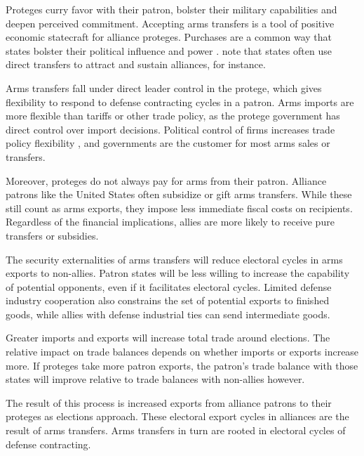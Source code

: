 \documentclass[12pt]{article}
\begin{document}
Proteges curry favor with their patron, bolster their military capabilities and deepen perceived commitment.
Accepting arms transfers is a tool of positive economic statecraft for alliance proteges. 
Purchases are a common way that states bolster their political influence and power \citep[pg. 42-3]{Baldwin2020}.
\citet[pg. 184-5]{IkenberryGrieco2003} note that states often use direct transfers to attract and sustain alliances, for instance.  


Arms transfers fall under direct leader control in the protege, which gives flexibility to respond to defense contracting cycles in a patron.
Arms imports are more flexible than tariffs or other trade policy, as the protege government has direct control over import decisions.
Political control of firms increases trade policy flexibility \citep{Davisetal2019}, and governments are the customer for most arms sales or transfers. 


Moreover, proteges do not always pay for arms from their patron.
Alliance patrons like the United States often subsidize or gift arms transfers. 
While these still count as arms exports, they impose less immediate fiscal costs on recipients.
Regardless of the financial implications, allies are more likely to receive pure transfers or subsidies.


The security externalities of arms transfers will reduce electoral cycles in arms exports to non-allies. 
Patron states will be less willing to increase the capability of potential opponents, even if it facilitates electoral cycles.
Limited defense industry cooperation also constrains the set of potential exports to finished goods, while allies with defense industrial ties can send intermediate goods.


Greater imports and exports will increase total trade around elections. 
The relative impact on trade balances depends on whether imports or exports increase more. 
If proteges take more patron exports, the patron's trade balance with those states will improve relative to trade balances with non-allies however.

The result of this process is increased exports from alliance patrons to their proteges as elections approach.
These electoral export cycles in alliances are the result of arms transfers. 
Arms transfers in turn are rooted in electoral cycles of defense contracting.
\end{document}
